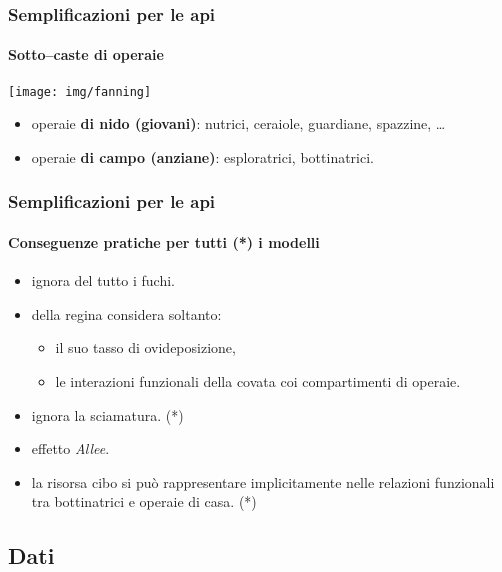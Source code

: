 \documentclass[]{beamer}
\begin{document}
\begin{frame}
    \frametitle{Semplificazioni per le api}
    \framesubtitle{Sotto--caste di operaie}

    \begin{center}
        \texttt{[image: img/fanning]}
    \end{center}

    \begin{itemize}
        \item operaie \textbf{di nido (giovani)}: \pause nutrici, \pause ceraiole, guardiane, spazzine, \dots
        \item \pause operaie \textbf{di campo (anziane)}: \pause esploratrici, bottinatrici.
    \end{itemize}


\end{frame}

\begin{frame}
    \frametitle{Semplificazioni per le api}
    \framesubtitle{Conseguenze pratiche per tutti (*) i modelli}


    \begin{itemize}
        \item ignora del tutto i fuchi.
        \item \pause della regina considera soltanto:
        \begin{itemize}
            \item \pause il suo tasso di ovideposizione,
            \item \pause le interazioni funzionali della covata coi compartimenti di operaie.
        \end{itemize}
        \item \pause ignora la sciamatura. (*)
        \item \pause effetto \emph{Allee}.
        \item \pause la risorsa cibo si può rappresentare implicitamente nelle relazioni funzionali tra
            bottinatrici e operaie di casa. (*)
    \end{itemize}
\end{frame}


\subsection{Dati}
\end{document}
